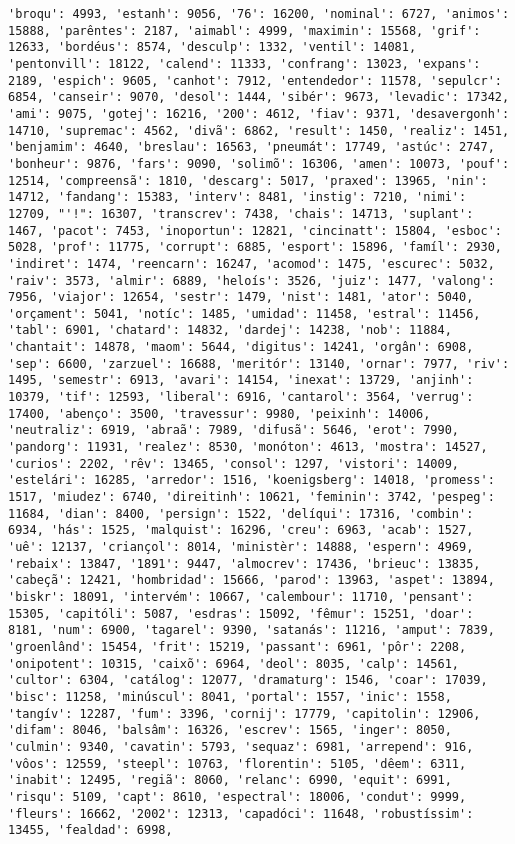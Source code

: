 \documentclass[11pt]{article}
\begin{document}
\begin{Verbatim}[commandchars=\\\{\}]
'broqu': 4993, 'estanh': 9056, '76': 16200, 'nominal': 6727, 'animos': 15888, 'parêntes': 2187, 'aimabl': 4999, 'maximin': 15568, 'grif': 12633, 'bordéus': 8574, 'desculp': 1332, 'ventil': 14081, 'pentonvill': 18122, 'calend': 11333, 'confrang': 13023, 'expans': 2189, 'espich': 9605, 'canhot': 7912, 'entendedor': 11578, 'sepulcr': 6854, 'canseir': 9070, 'desol': 1444, 'sibér': 9673, 'levadic': 17342, 'ami': 9075, 'gotej': 16216, '200': 4612, 'fiav': 9371, 'desavergonh': 14710, 'supremac': 4562, 'divã': 6862, 'result': 1450, 'realiz': 1451, 'benjamim': 4640, 'breslau': 16563, 'pneumát': 17749, 'astúc': 2747, 'bonheur': 9876, 'fars': 9090, 'solimõ': 16306, 'amen': 10073, 'pouf': 12514, 'compreensã': 1810, 'descarg': 5017, 'praxed': 13965, 'nin': 14712, 'fandang': 15383, 'interv': 8481, 'instig': 7210, 'nimi': 12709, "'!": 16307, 'transcrev': 7438, 'chais': 14713, 'suplant': 1467, 'pacot': 7453, 'inoportun': 12821, 'cincinatt': 15804, 'esboc': 5028, 'prof': 11775, 'corrupt': 6885, 'esport': 15896, 'famíl': 2930, 'indiret': 1474, 'reencarn': 16247, 'acomod': 1475, 'escurec': 5032, 'raiv': 3573, 'almir': 6889, 'heloís': 3526, 'juiz': 1477, 'valong': 7956, 'viajor': 12654, 'sestr': 1479, 'nist': 1481, 'ator': 5040, 'orçament': 5041, 'notíc': 1485, 'umidad': 11458, 'estral': 11456, 'tabl': 6901, 'chatard': 14832, 'dardej': 14238, 'nob': 11884, 'chantait': 14878, 'maom': 5644, 'digitus': 14241, 'orgân': 6908, 'sep': 6600, 'zarzuel': 16688, 'meritór': 13140, 'ornar': 7977, 'riv': 1495, 'semestr': 6913, 'avari': 14154, 'inexat': 13729, 'anjinh': 10379, 'tif': 12593, 'liberal': 6916, 'cantarol': 3564, 'verrug': 17400, 'abenço': 3500, 'travessur': 9980, 'peixinh': 14006, 'neutraliz': 6919, 'abraã': 7989, 'difusã': 5646, 'erot': 7990, 'pandorg': 11931, 'realez': 8530, 'monóton': 4613, 'mostra': 14527, 'curios': 2202, 'rêv': 13465, 'consol': 1297, 'vistori': 14009, 'estelári': 16285, 'arredor': 1516, 'koenigsberg': 14018, 'promess': 1517, 'miudez': 6740, 'direitinh': 10621, 'feminin': 3742, 'pespeg': 11684, 'dian': 8400, 'persign': 1522, 'delíqui': 17316, 'combin': 6934, 'hás': 1525, 'malquist': 16296, 'creu': 6963, 'acab': 1527, 'uê': 12137, 'criançol': 8014, 'ministèr': 14888, 'espern': 4969, 'rebaix': 13847, '1891': 9447, 'almocrev': 17436, 'brieuc': 13835, 'cabeçã': 12421, 'hombridad': 15666, 'parod': 13963, 'aspet': 13894, 'biskr': 18091, 'intervém': 10667, 'calembour': 11710, 'pensant': 15305, 'capitóli': 5087, 'esdras': 15092, 'fêmur': 15251, 'doar': 8181, 'num': 6900, 'tagarel': 9390, 'satanás': 11216, 'amput': 7839, 'groenlând': 15454, 'frit': 15219, 'passant': 6961, 'pôr': 2208, 'onipotent': 10315, 'caixõ': 6964, 'deol': 8035, 'calp': 14561, 'cultor': 6304, 'catálog': 12077, 'dramaturg': 1546, 'coar': 17039, 'bisc': 11258, 'minúscul': 8041, 'portal': 1557, 'inic': 1558, 'tangív': 12287, 'fum': 3396, 'cornij': 17779, 'capitolin': 12906, 'difam': 8046, 'balsâm': 16326, 'escrev': 1565, 'inger': 8050, 'culmin': 9340, 'cavatin': 5793, 'sequaz': 6981, 'arrepend': 916, 'vôos': 12559, 'steepl': 10763, 'florentin': 5105, 'dêem': 6311, 'inabit': 12495, 'regiã': 8060, 'relanc': 6990, 'equit': 6991, 'risqu': 5109, 'capt': 8610, 'espectral': 18006, 'condut': 9999, 'fleurs': 16662, '2002': 12313, 'capadóci': 11648, 'robustíssim': 13455, 'fealdad': 6998, 
\end{Verbatim}
\end{document}
